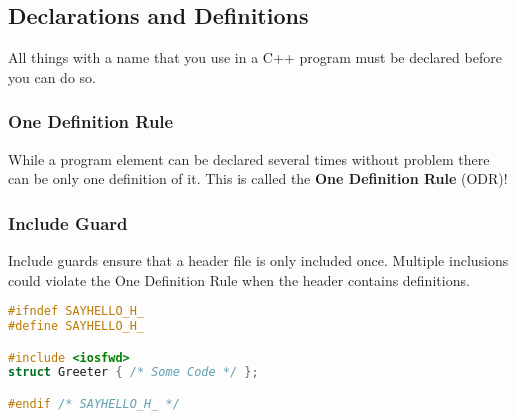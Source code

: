 \subsection{Declarations and Definitions}
All things with a name that you use in a C++ program must be declared before you can do so.

\subsubsection{One Definition Rule}
While a program element can be declared several times without problem there can be only one definition of it. This is called the \textbf{One Definition Rule} (ODR)!

\subsubsection{Include Guard}
Include guards ensure that a header file is only included once. Multiple inclusions could violate the One Definition Rule when the header contains definitions.

\begin{lstlisting}[style=frame, style= linenumbers, language=C]
#ifndef SAYHELLO_H_
#define SAYHELLO_H_

#include <iosfwd>
struct Greeter { /* Some Code */ };

#endif /* SAYHELLO_H_ */
\end{lstlisting}

